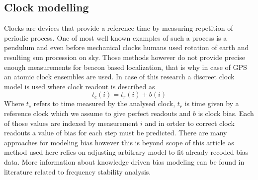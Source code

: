 \documentclass{kybernetika}
\begin{document}
\subsection{Clock modelling}
Clocks are devices that provide a reference time by measuring repetition of periodic 
process. One of most well known examples of such a process is a pendulum and even before
mechanical clocks humans used rotation of earth and resulting sun procession on sky.
Those methods however do not provide precise enough measurements for beacon based localization,
that is why in case of GPS an atomic clock ensembles are used.
In case of this research a discreet clock model is used where clock readout is described as 
\begin{equation}
	t_{c}(i) = t_{r}(i) + b(i)
\end{equation}
Where $t_{c}$ refers to time measured by the analysed clock, $t_{r}$ is time given by a 
reference clock which we assume to give perfect readouts and $b$ is clock bias.
Each of those values are indexed by measurement $i$ and in ortder to correct clock readouts
a value of bias for each step must be predicted.
There are many approaches for modeling bias however this is beyond scope of this article
as method used here relies on adjusting arbitrary model to fit already recoded bias data.
More information about knowledge driven bias modeling can be found in literature related to
frequency stability analysis\cite{Riley1994}.

\end{document}
